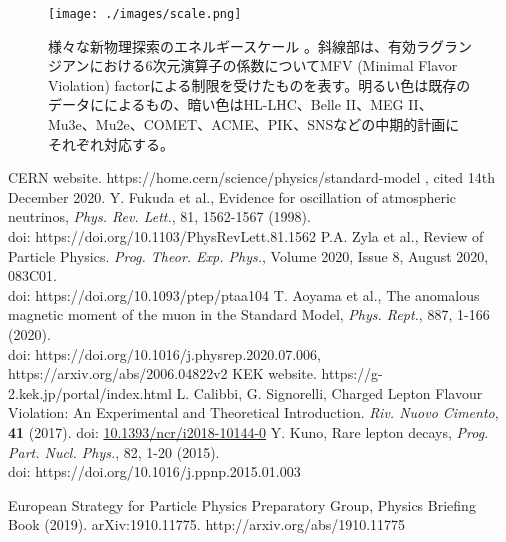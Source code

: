 \documentclass[Yonemoto_master.tex]{subfiles}
\begin{document}
\begin{figure}[h]
\begin{center}
\texttt{[image: ./images/scale.png]}
\caption{様々な新物理探索のエネルギースケール \cite{np_strategy}。斜線部は、有効ラグランジアンにおける6次元演算子の係数についてMFV (Minimal Flavor Violation) factorによる制限を受けたものを表す。明るい色は既存のデータにによるもの、暗い色はHL-LHC、Belle II、MEG II、Mu3e、Mu2e、COMET、ACME、PIK、SNSなどの中期的計画にそれぞれ対応する。}
\label{fig: np_scale}
\end{center}
\end{figure}



{  }{
\begin{thebibliography}{99}
 CERN website. https://home.cern/science/physics/standard-model , cited 14th December 2020.
 Y. Fukuda et al., Evidence for oscillation of atmospheric neutrinos, {\it Phys. Rev. Lett.}, 81, 1562-1567 (1998). \\
doi: https://doi.org/10.1103/PhysRevLett.81.1562
 P.A. Zyla et al., Review of Particle Physics.  {\it Prog. Theor. Exp. Phys.}, Volume 2020, Issue 8, August 2020, 083C01. \\
doi: https://doi.org/10.1093/ptep/ptaa104
 T. Aoyama et al., The anomalous magnetic moment of the muon in the Standard Model, {\it Phys. Rept.}, 887, 1-166 (2020). \\
doi: https://doi.org/10.1016/j.physrep.2020.07.006, https://arxiv.org/abs/2006.04822v2
 KEK website. https://g-2.kek.jp/portal/index.html
 L. Calibbi, G. Signorelli, Charged Lepton Flavour Violation: An Experimental and Theoretical Introduction. {\it Riv. Nuovo Cimento}, {\bf 41} (2017).
doi: \href{https://doi.org/10.1393/ncr/i2018-10144-0}{10.1393/ncr/i2018-10144-0}
 Y. Kuno, Rare lepton decays, {\it Prog. Part. Nucl. Phys.}, 82, 1-20 (2015). \\
doi: https://doi.org/10.1016/j.ppnp.2015.01.003

 European Strategy for Particle Physics Preparatory Group, Physics Briefing Book (2019). arXiv:1910.11775. http://arxiv.org/abs/1910.11775
\end{thebibliography}
}
\end{document}
